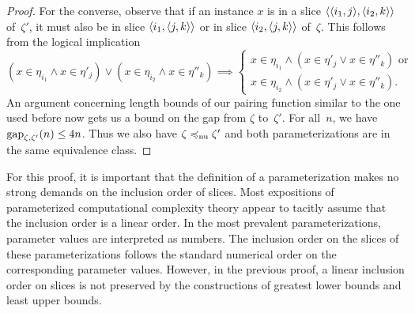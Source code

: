 \begin{proof}
  For the converse, observe that if an instance $x$ is in a slice ${\langle {\langle i_1, j\rangle}, {\langle i_2, k\rangle}\rangle}$ of~$\zeta'$, it must also be in slice ${\langle i_1, {\langle j, k\rangle}\rangle}$ or in slice ${\langle i_2, {\langle j, k\rangle}\rangle}$ of~$\zeta$.
  This follows from the logical implication
  \begin{equation*}
    (x \in \eta_{i_1} \land x \in \eta'_j) \lor (x \in \eta_{i_2} \land x \in \eta''_k) \implies \begin{cases}
      x \in \eta_{i_1} \land (x \in \eta'_j \lor x \in \eta''_k)\text{ or} \\
      x \in \eta_{i_2} \land (x \in \eta'_j \lor x \in \eta''_k).
    \end{cases}
  \end{equation*}
  An argument concerning length bounds of our pairing function similar to the one used before now gets us a bound on the gap from $\zeta$ to~$\zeta'$.
  For all~$n$, we have $\operatorname{gap}_{\zeta, \zeta'}(n) \le 4n$.
  Thus we also have $\zeta \preccurlyeq_\mathrm{nu} \zeta'$ and both parameterizations are in the same equivalence class.
\end{proof}

For this proof, it is important that the definition of a parameterization makes no strong demands on the inclusion order of slices.
Most expositions of parameterized computational complexity theory appear to tacitly assume that the inclusion order is a linear order.
In the most prevalent parameterizations, parameter values are interpreted as numbers.
The inclusion order on the slices of these parameterizations follows the standard numerical order on the corresponding parameter values.
However, in the previous proof, a linear inclusion order on slices is not preserved by the constructions of greatest lower bounds and least upper bounds.

